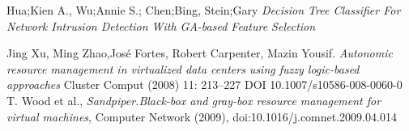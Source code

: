 \documentclass[conference]{IEEEtran}
\begin{document}
\begin{thebibliography}{1}

Hua;Kien A., Wu;Annie S.; Chen;Bing, Stein;Gary
\emph{Decision Tree Classifier For Network Intrusion Detection
With GA-based Feature Selection}

Jing Xu, Ming Zhao,José Fortes, Robert Carpenter,
Mazin Yousif. \emph{Autonomic resource management in virtualized data centers using
fuzzy logic-based approaches} Cluster Comput (2008) 11: 213–227
DOI 10.1007/s10586-008-0060-0
T. Wood et al., \emph{Sandpiper.Black-box and gray-box resource management for virtual machines}, Computer Network (2009), doi:10.1016/j.comnet.2009.04.014
\end{thebibliography}
\end{document}
